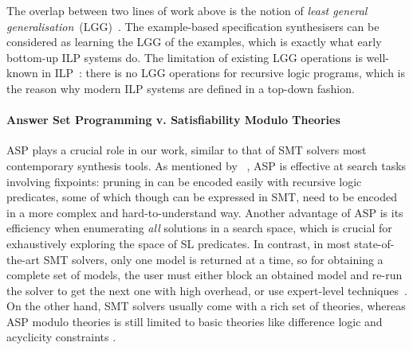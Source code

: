 The overlap between two lines of work above is the notion of
\emph{least general generalisation}~(LGG)~\cite{plotkin1970note}. The
example-based specification synthesisers can be considered as learning
the LGG of the examples, which is exactly what early bottom-up ILP
systems do. The limitation of existing LGG operations is well-known in
ILP~\cite{CropperD22}: there is no LGG operations for recursive logic
programs, which is the reason why modern ILP systems are defined in a
top-down fashion.

\paragraph{Answer Set Programming v. Satisfiability Modulo Theories}

ASP plays a crucial role in our work, similar to that of SMT solvers
most contemporary synthesis tools. 
%
As mentioned by \citeauthor{bembenek2023smt}~\cite{bembenek2023smt},
ASP is effective at search tasks involving fixpoints: pruning in \tool
can be encoded easily with recursive logic predicates, some of which
though can be expressed in SMT, need to be encoded in a more complex
and hard-to-understand way.
%
Another advantage of ASP is its efficiency when enumerating \emph{all}
solutions in a search space, which is crucial for exhaustively exploring
the space of SL predicates. 
%
In contrast, in most state-of-the-art SMT solvers, only one model is
returned at a time, so for obtaining a complete set of models, the
user must either block an obtained model and re-run the solver to get
the next one with high overhead, or use expert-level
techniques~\cite{bjorner2022user}.
%
On the other hand, SMT solvers usually come with a rich set of
theories, whereas ASP modulo theories is still limited to basic
theories like difference logic
\cite{DBLP:journals/tplp/JanhunenKOSWS17,DBLP:journals/algorithms/RajaratnamSWCLS23}
and acyclicity constraints \cite{DBLP:conf/lpnmr/BomansonGJKS15}.


